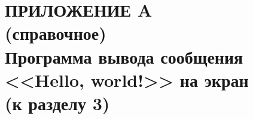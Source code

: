 \renewcommand{\thefigure}{\Asbuk{section}.\arabic{figure}}
\renewcommand{\thetable}{\Asbuk{section}.\arabic{table}}
\renewcommand{\thelstlisting}{\Asbuk{section}.\arabic{lstlisting}}

\pagestyle{fancy}
\fancyhf{} %
\fancyfoot[R]{\thepage} 
\renewcommand{\headrulewidth}{0pt}
\renewcommand{\footrulewidth}{0pt}

\setlength{\headheight}{10mm}
\setlength{\headsep}{\baselineskip}

\section*{ПРИЛОЖЕНИЕ A\\(справочное)\\Программа вывода сообщения <<Hello, world!>> на экран\\(к разделу 3)}
\label{sec:appendix_a}
\thispagestyle{plain} 
\setcounter{section}{1}
\setcounter{figure}{0}
\setcounter{table}{0}
\setcounter{lstlisting}{0}

